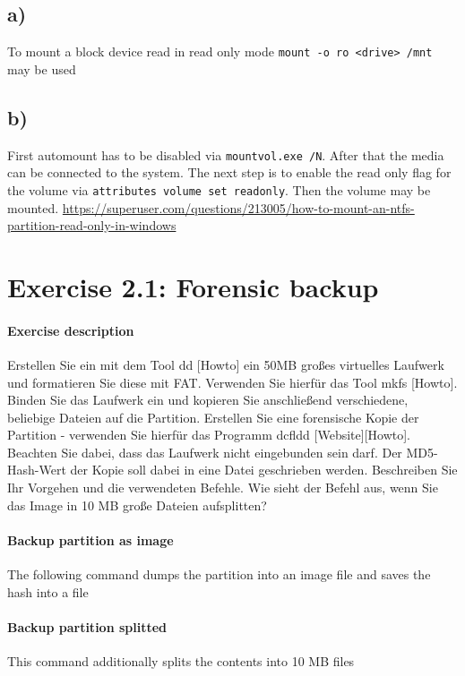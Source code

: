\documentclass[10pt,a4paper]{article}
\begin{document}
\subsection{a)}
To mount a block device read in read only mode \Verb+mount -o ro <drive> /mnt+ may be used
\subsection{b)}
First automount has to be disabled via \Verb+mountvol.exe /N+. After that the media can be connected to the system. The next step is to enable the read only flag for the volume via \Verb+attributes volume set readonly+. Then the volume may be mounted.
\url{https://superuser.com/questions/213005/how-to-mount-an-ntfs-partition-read-only-in-windows}

\section{Exercise 2.1: Forensic backup}
\paragraph{Exercise description}
Erstellen Sie ein mit dem Tool dd [Howto] ein 50MB großes virtuelles Laufwerk und formatieren Sie diese mit FAT.
Verwenden Sie hierfür das Tool mkfs [Howto]. Binden Sie das Laufwerk ein und kopieren Sie anschließend verschiedene,
beliebige Dateien auf die Partition.
Erstellen Sie eine forensische Kopie der Partition - verwenden Sie hierfür das Programm dcfldd [Website][Howto].
Beachten Sie dabei, dass das Laufwerk nicht eingebunden sein darf. Der MD5-Hash-Wert der Kopie soll dabei in eine Datei
geschrieben werden. Beschreiben Sie Ihr Vorgehen und die verwendeten Befehle. Wie sieht der Befehl aus, wenn Sie das
Image in 10 MB große Dateien aufsplitten?
\paragraph{Backup partition as image}
The following command dumps the partition into an image file and saves the hash into a file

\paragraph{Backup partition splitted}
This command additionally splits the contents into 10 MB files
\end{document}

